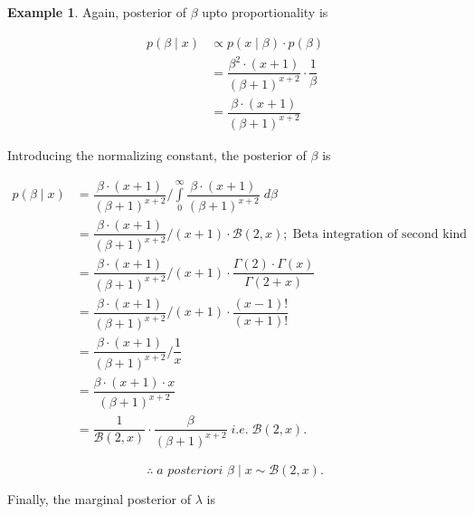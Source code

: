 \documentclass[12pt, a4paper]{article}
\theoremstyle{definition}
\newtheorem{example}{Example}
\begin{document}
\begin{example}
Again, posterior of $\beta$ upto proportionality is

\begin{align*}
p\left(\beta \mid x \right) &\propto p\left( x \mid \beta \right) \cdot p\left( \beta \right) \\[0.5em]
&= \dfrac{\beta^{2} \cdot \left( x + 1 \right)}{\left( \beta + 1 \right)^{x + 2}} \cdot \dfrac{1}{\beta} \\[0.5em]
&= \dfrac{\beta \cdot \left( x + 1 \right)}{\left( \beta + 1 \right)^{x + 2}}
\end{align*}

Introducing the normalizing constant, the posterior of $\beta$ is 

\begin{align*}
p\left( \beta \mid x \right) &= \dfrac{\beta \cdot \left( x + 1 \right)}{\left( \beta + 1 \right)^{x + 2}} \Bigg/ \displaystyle{\int \limits_{0}^{\infty} \dfrac{\beta \cdot \left( x + 1 \right)}{\left( \beta + 1 \right)^{x + 2}} \; d\beta} \\[0.5em]
&= \dfrac{\beta \cdot \left( x + 1 \right)}{\left( \beta + 1 \right)^{x + 2}} \Bigg/ \left( x + 1 \right) \cdot \mathcal{B}\left( 2, x \right); \; \text{Beta integration of second kind} \\[0.5em]
&= \dfrac{\beta \cdot \left( x + 1 \right)}{\left( \beta + 1 \right)^{x + 2}} \Bigg/ \left( x + 1 \right) \cdot \dfrac{\Gamma\left( 2 \right) \cdot \Gamma\left( x \right)}{\Gamma\left( 2 + x \right)} \\[0.5em]
&= \dfrac{\beta \cdot \left( x + 1 \right)}{\left( \beta + 1 \right)^{x + 2}} \Bigg/ \left( x + 1 \right) \cdot \dfrac{\left( x - 1 \right)!}{\left( x + 1 \right)!} \\[0.5em]
&= \dfrac{\beta \cdot \left( x + 1 \right)}{\left( \beta + 1 \right)^{x + 2}} \Bigg/ \dfrac{1}{x} \\[0.5em]
&= \dfrac{\beta \cdot \left( x + 1 \right) \cdot x}{\left( \beta + 1 \right)^{x + 2}} \\[0.5em]
&= \dfrac{1}{\mathcal{B}\left( 2 , x \right)} \cdot \dfrac{\beta}{\left( \beta + 1 \right)^{x + 2}} \; \textit{i.e.} \; \mathcal{B}(2, x).
\end{align*}

$$\boxed{\therefore \; \textit{a posteriori } \beta \mid x \sim \mathcal{B}\left( 2, x \right).}$$

\newpage

Finally, the marginal posterior of $\lambda$ is


\end{example}
\end{document}
